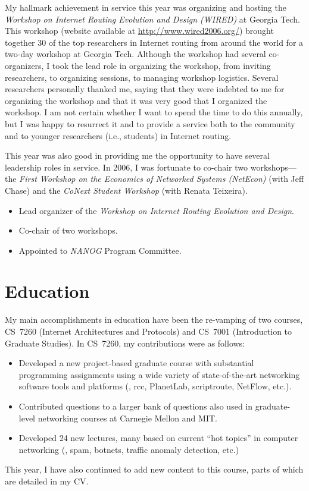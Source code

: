 \begin{sloppypar}
My hallmark achievement in service this year was organizing and hosting
the {\em Workshop on Internet Routing Evolution and Design (WIRED)} at
Georgia Tech.  This workshop (website available at
\url{http://www.wired2006.org/}) brought together 30 of the top
researchers in Internet routing from around the world for a two-day
workshop at Georgia Tech.  Although the workshop had several
co-organizers, I took the lead role in organizing the workshop, from
inviting researchers, to organizing sessions, to managing workshop
logistics.  Several researchers personally thanked me, saying that they
were indebted to me for organizing the workshop and that it was very
good that I organized the workshop.  I am not certain whether I want to
spend the time to do this annually, but I was happy to resurrect it and
to provide a service both to the community and to younger researchers
(i.e., students) in Internet routing.

This year was also good in providing me the opportunity to have several
leadership roles in service.  In 2006, I was fortunate to co-chair two
workshops---the {\em First Workshop on the Economics of Networked
Systems (NetEcon)} (with Jeff Chase) and the {\em CoNext Student
Workshop} (with Renata Teixeira).

\begin{itemize}
\itemsep=-1pt
\item Lead organizer of the {\em Workshop on Internet Routing Evolution
  and Design}.
\item Co-chair of two workshops.
\item Appointed to {\em NANOG} Program Committee.
\end{itemize}

\section*{Education}

My main accomplishments in education have been the re-vamping of two
courses, CS~7260 (Internet Architectures and Protocols) and CS~7001
(Introduction to Graduate Studies).  In CS~7260, my contributions were
as follows:
\begin{itemize}
\itemsep=-1pt
\item Developed a new project-based graduate course
with substantial programming assignments using a wide variety of
state-of-the-art networking software tools and platforms (\eg, rcc,
PlanetLab, scriptroute, NetFlow, etc.).  
\item Contributed questions to a
larger bank of questions also used in graduate-level networking courses
at Carnegie Mellon and MIT.  
\item Developed 24 new lectures, many based on
current ``hot topics'' in computer networking (\eg, spam, botnets,
traffic anomaly detection, etc.)
\end{itemize}
\noindent
This year, I have also continued to add new content to this course, parts
of which are detailed in my CV.  


\end{sloppypar}
